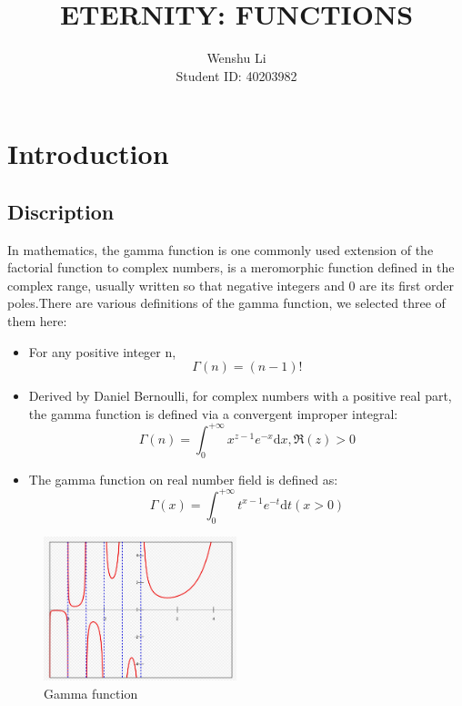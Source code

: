 \documentclass{report}
\begin{document}
\title{ETERNITY: FUNCTIONS}
\author{Wenshu Li\\Student ID: 40203982}
\date{}
\maketitle

\makeatletter
\let\thetitle\@title
\let\theauthor\@author
\let\thedate\@date
\makeatother





\tableofcontents
\newpage
\section{Introduction}
\subsection{Discription}
In mathematics, the gamma function is one commonly used extension of the factorial function to complex numbers, is a meromorphic function defined in the complex range, usually written so that negative integers and 0 are its first order poles.There are various definitions of the gamma function, we selected three of them here:
\begin{itemize}
\item For any positive integer n,
\\$$\Gamma \left ( n\right ) = \left ( n-1 \right )!$$
\item Derived by Daniel Bernoulli, for complex numbers with a positive real part, the gamma function is defined via a convergent improper integral:
\\$$\Gamma \left ( n\right ) = \int_{0}^{+\infty} x^{z-1} e^{-x}\mathrm{d}x,  \Re\left ( z \right )>0$$
\item The gamma function on real number field is defined as:
\\$$\Gamma \left ( x \right ) =\int_{0}^{+\infty } t^{x-1} e^{-t} \mathrm{d}t \left (  x>0\right ) $$
\end{itemize} 

\begin{figure}[h]
\caption{Gamma function}
\centering
\includegraphics[width=0.5\textwidth]{gamma}
\end{figure}
\end{document}
